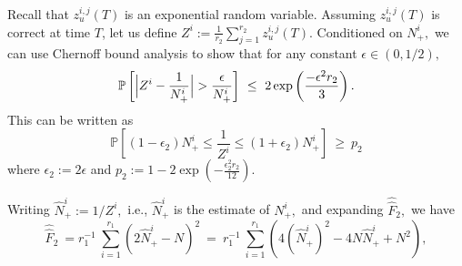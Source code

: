 \documentclass[10pt,twosided,a4paper,draft,onecolumn]{article}
\newcommand{\abs}[1]{\Bigl\lvert#1\Bigr\rvert}
\newcommand{\prob}[1]{\mathbb{P}\left[ #1 \right]}
\begin{document}
Recall that $z_u^{i,j}(T)$ is an exponential random variable.
 Assuming $z_u^{i,j}(T)$ is correct at time $T$, let us
define $Z^i :=\frac{1}{r_2} \sum\limits_{j=1}^{r_2} z_u^{i,j}(T).$
Conditioned on $N_{+}^{i},$ we can use Chernoff bound analysis to show
that for any constant $\epsilon \in (0,1/2),$
\begin{displaymath}
  \prob{ \abs{Z^i - \frac{1}{N_+^i}} > \frac{\epsilon}{N_+^i}}
  \ \leq \ 2 \exp \left(\frac{-\epsilon^2r_2}{3}\right). 
\end{displaymath}
This can be written as
\begin{equation}
  \prob{ (1-\epsilon_2)N_+^i \leq \frac{1}{Z^i} \leq
    (1+\epsilon_2)N_+^i} \ \geq \ p_2 \label{eq:p2} 
\end{equation}
where $\epsilon_2 := 2\epsilon$ and $p_2 := 1-2
\exp\left(-\frac{\epsilon_2^2r_2}{12}\right).$


Writing $\hat{N}_+^i:=1/Z^i,$ i.e., $\hat{N}_+^i$ is the estimate of
$N_+^i,$ and expanding $\hat{\hat{F}}_2,$ we have
\begin{displaymath}
  \hat{\hat{F}}_2 \ =  r_1^{-1} \ \sum\limits_{i=1}^{r_1}(2\hat{N}_+^i -
  N)^2  \ =  \ r_1^{-1} \ \sum\limits_{i=1}^{r_1}\left(4
    \left(\hat{N}_+^i \right)^2 - 4 N\hat{N}_+^i + N^2\right), 
\end{displaymath}
\end{document}
